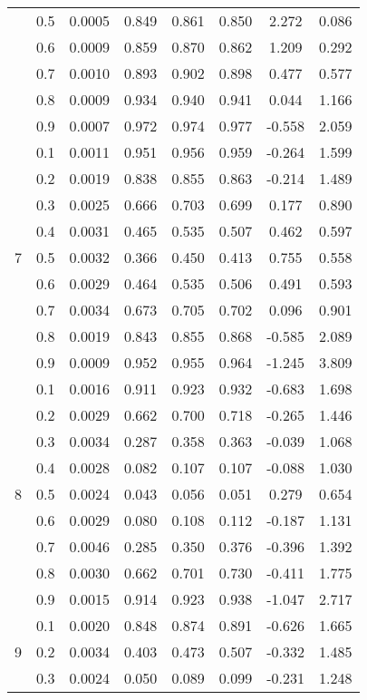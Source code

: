 \documentclass[11pt,a4paper]{report}
\begin{document}
\begin{longtable}{ | c | c || c | c | c | c | c | c | }
 & 0.5 & 0.0005 & 0.849 & 0.861 & 0.850 & 2.272 & 0.086 \\
 & 0.6 & 0.0009 & 0.859 & 0.870 & 0.862 & 1.209 & 0.292 \\
 & 0.7 & 0.0010 & 0.893 & 0.902 & 0.898 & 0.477 & 0.577 \\
 & 0.8 & 0.0009 & 0.934 & 0.940 & 0.941 & 0.044 & 1.166 \\
 & 0.9 & 0.0007 & 0.972 & 0.974 & 0.977 & -0.558 & 2.059 \\
 \hline
\multirow{9}{*}{7} & 0.1 & 0.0011 & 0.951 & 0.956 & 0.959 & -0.264 & 1.599 \\
 & 0.2 & 0.0019 & 0.838 & 0.855 & 0.863 & -0.214 & 1.489 \\
 & 0.3 & 0.0025 & 0.666 & 0.703 & 0.699 & 0.177 & 0.890 \\
 & 0.4 & 0.0031 & 0.465 & 0.535 & 0.507 & 0.462 & 0.597 \\
 & 0.5 & 0.0032 & 0.366 & 0.450 & 0.413 & 0.755 & 0.558 \\
 & 0.6 & 0.0029 & 0.464 & 0.535 & 0.506 & 0.491 & 0.593 \\
 & 0.7 & 0.0034 & 0.673 & 0.705 & 0.702 & 0.096 & 0.901 \\
 & 0.8 & 0.0019 & 0.843 & 0.855 & 0.868 & -0.585 & 2.089 \\
 & 0.9 & 0.0009 & 0.952 & 0.955 & 0.964 & -1.245 & 3.809 \\
 \hline
\multirow{9}{*}{8} & 0.1 & 0.0016 & 0.911 & 0.923 & 0.932 & -0.683 & 1.698 \\
 & 0.2 & 0.0029 & 0.662 & 0.700 & 0.718 & -0.265 & 1.446 \\
 & 0.3 & 0.0034 & 0.287 & 0.358 & 0.363 & -0.039 & 1.068 \\
 & 0.4 & 0.0028 & 0.082 & 0.107 & 0.107 & -0.088 & 1.030 \\
 & 0.5 & 0.0024 & 0.043 & 0.056 & 0.051 & 0.279 & 0.654 \\
 & 0.6 & 0.0029 & 0.080 & 0.108 & 0.112 & -0.187 & 1.131 \\
 & 0.7 & 0.0046 & 0.285 & 0.350 & 0.376 & -0.396 & 1.392 \\
 & 0.8 & 0.0030 & 0.662 & 0.701 & 0.730 & -0.411 & 1.775 \\
 & 0.9 & 0.0015 & 0.914 & 0.923 & 0.938 & -1.047 & 2.717 \\
 \hline
\multirow{9}{*}{9} & 0.1 & 0.0020 & 0.848 & 0.874 & 0.891 & -0.626 & 1.665 \\
 & 0.2 & 0.0034 & 0.403 & 0.473 & 0.507 & -0.332 & 1.485 \\
 & 0.3 & 0.0024 & 0.050 & 0.089 & 0.099 & -0.231 & 1.248 \\

\end{longtable}
\end{document}
